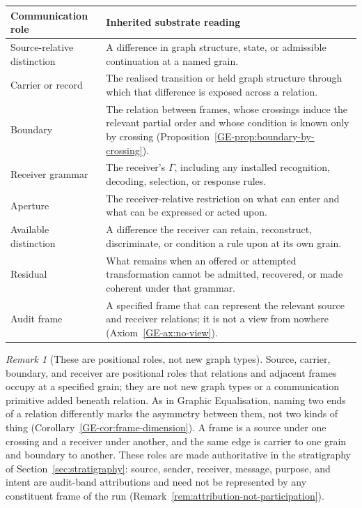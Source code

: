 \documentclass[11pt,a4paper]{article}
\theoremstyle{remark}\newtheorem{remark}[definition]{Remark}
\begin{document}
\begin{center}\small
\begin{tabular}{@{}>{\raggedright\arraybackslash}p{}>{\raggedright\arraybackslash}p{}@{}}
\toprule
\textbf{Communication role} & \textbf{Inherited substrate reading}\\
\midrule
Source-relative distinction & A difference in graph structure, state, or admissible continuation at a named grain.\\
Carrier or record & The realised transition or held graph structure through which that difference is exposed across a relation.\\
Boundary & The relation between frames, whose crossings induce the relevant partial order and whose condition is known only by crossing (Proposition~\ref{GE-prop:boundary-by-crossing}).\\
Receiver grammar & The receiver's $\Gamma$, including any installed recognition, decoding, selection, or response rules.\\
Aperture & The receiver-relative restriction on what can enter and what can be expressed or acted upon.\\
Available distinction & A difference the receiver can retain, reconstruct, discriminate, or condition a rule upon at its own grain.\\
Residual & What remains when an offered or attempted transformation cannot be admitted, recovered, or made coherent under that grammar.\\
Audit frame & A specified frame that can represent the relevant source and receiver relations; it is not a view from nowhere (Axiom~\ref{GE-ax:no-view}).\\
\bottomrule
\end{tabular}
\end{center}

\begin{remark}[These are positional roles, not new graph types]\label{rem:positional-roles}
Source, carrier, boundary, and receiver are positional roles that relations and
adjacent frames occupy at a specified grain; they are not new graph types or a
communication primitive added beneath relation. As in Graphic Equalisation,
naming two ends of a relation differently marks the asymmetry between them, not
two kinds of thing (Corollary~\ref{GE-cor:frame-dimension}). A frame is a source
under one crossing and a receiver under another, and the same edge is carrier to
one grain and boundary to another. These roles are made authoritative in the
stratigraphy of Section~\ref{sec:stratigraphy}: source, sender, receiver,
message, purpose, and intent are audit-band attributions and need not be
represented by any constituent frame of the run
(Remark~\ref{rem:attribution-not-participation}).
\end{remark}
\end{document}
